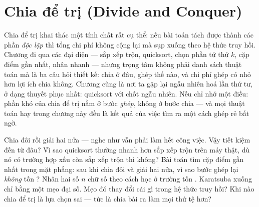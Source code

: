 \documentclass[../../algorithm.tex]{subfiles}
\begin{document}
\chapter{Chia để trị (Divide and Conquer)}

\begin{tomtat}
Chia để trị khai thác một tính chất rất cụ thể: nếu bài toán tách được thành các phần \emph{độc lập} thì tổng chi phí không cộng lại mà sụp xuống theo hệ thức truy hồi. Chương đi qua các đại diện --- sắp xếp trộn, quicksort, chọn phần tử thứ \(k\), cặp điểm gần nhất, nhân nhanh --- nhưng trọng tâm không phải danh sách thuật toán mà là ba câu hỏi thiết kế: chia ở đâu, ghép thế nào, và chi phí ghép có nhỏ hơn lợi ích chia không. Chương cũng là nơi ta gặp lại ngẫu nhiên hoá lần thứ tư, ở dạng thuyết phục nhất: quicksort với chốt ngẫu nhiên. Nếu chỉ nhớ một điều: phần khó của chia để trị nằm ở bước \emph{ghép}, không ở bước chia --- và mọi thuật toán hay trong chương này đều là kết quả của việc tìm ra một cách ghép rẻ bất ngờ.
\end{tomtat}

\begin{nentang}
\end{nentang}

\begin{khoigoi}
\h{Chia đôi rồi giải hai nửa --- nghe như vẫn phải làm hết công việc. Vậy tiết kiệm đến từ đâu?}
\h{Vì sao quicksort thường nhanh hơn sắp xếp trộn trên máy thật, dù nó có trường hợp xấu  còn sắp xếp trộn thì không?}
\h{Bài toán tìm cặp điểm gần nhất trong mặt phẳng: sau khi chia đôi và giải hai nửa, vì sao bước ghép lại \emph{không} tốn ?}
\h{Nhân hai số \(n\) chữ số theo cách học ở trường tốn . Karatsuba xuống  chỉ bằng một mẹo đại số. Mẹo đó thay đổi cái gì trong hệ thức truy hồi?}
\h{Khi nào chia để trị là lựa chọn sai --- tức là chia bài ra làm mọi thứ tệ hơn?}
\end{khoigoi}
\end{document}
